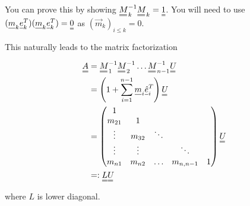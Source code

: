 You can prove this by showing $\mat{M}_{k}^{-1} \mat{M}_{k} = \mat{1}$. You will need to use 
$(\vec{m}_k \vec{e}_k^T)(\vec{m}_k \vec{e}_k^T) = \mat{0}$ as $(\vec{m}_k)_{i \leq k} = 0$.

This naturally leads to the matrix factorization

\begin{equation}
    \begin{aligned}
        \mat{A}&= \mat{M}_{1}^{-1} \mat{M}_{2}^{-1} \dots \mat{M}_{n-1}^{-1} \mat{U} \\
               &= \left( 1 + \sum_{i = 1}^{n-1} \vec{m}_i \vec{\hat{e}}_i^T \right) \mat{U} \\
               &= \begin{pmatrix}
                1 \\
                m_{21} & 1 \\
                \vdots & m_{32} & \ddots \\
                \vdots & \vdots & & \ddots \\
                m_{n1} & m_{n2} & \dots & m_{n,n-1} & 1
               \end{pmatrix} \mat{U} \\
               &=: \mat{L} \mat{U} 
    \end{aligned}
\end{equation}

where $L$ is lower diagonal.







